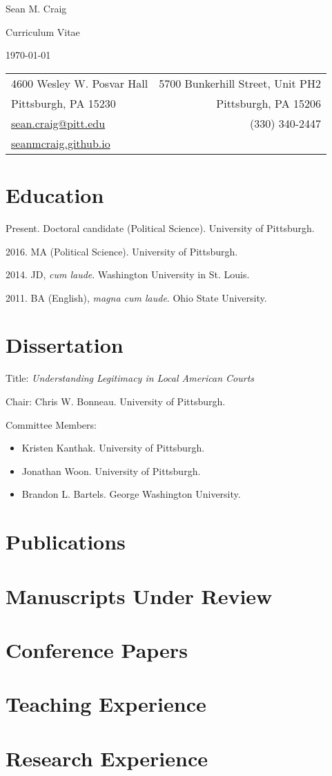 \documentclass[12pt]{article}
\begin{document}
\begin{center}
{\LARGE Sean M. Craig} \par Curriculum Vitae \par \today \par
\end{center}

\begin{tabular*}{\textwidth}{@{} l @{\extracolsep{\fill}} r @{}}
4600 Wesley W. Posvar Hall & 5700 Bunkerhill Street, Unit PH2 \\
Pittsburgh, PA 15230 & Pittsburgh, PA 15206 \\
\href{mailto:sean.craig@pitt.edu}{\ttfamily sean.craig@pitt.edu} & (330) 340-2447 \\
\href{https://seanmcraig.github.io}{\ttfamily seanmcraig.github.io} \\
\end{tabular*}

\section*{Education}
Present. Doctoral candidate (Political Science). University of Pittsburgh. \par
2016. MA (Political Science). University of Pittsburgh. \par
2014. JD, {\em cum laude}. Washington University in St. Louis. \par
2011. BA (English), {\em magna cum laude}. Ohio State University. \par


\section*{Dissertation}
Title: {\em Understanding Legitimacy in Local American Courts} \par
Chair: Chris W. Bonneau. University of Pittsburgh. \par
Committee Members:
\begin{itemize}
  \item Kristen Kanthak. University of Pittsburgh.
  \item Jonathan Woon. University of Pittsburgh.
  \item Brandon L. Bartels. George Washington University.
\end{itemize}

\section*{Publications}

\section*{Manuscripts Under Review}

\section*{Conference Papers}

\section*{Teaching Experience}

\section*{Research Experience}
\end{document}
